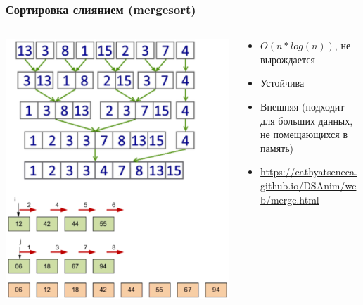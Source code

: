 \documentclass[xetex,mathserif,serif]{beamer}
\begin{document}
	\begin{frame}
		\frametitle{Сортировка слиянием (mergesort)}
		\begin{columns}
			\begin{column}{0.45\textwidth}
				\includegraphics[width=\textwidth]{mergesort.png}
			\end{column}
			\begin{column}{0.55\textwidth}
				\begin{itemize}
					\item $O(n * log(n))$, не вырождается
					\item Устойчива
					\item Внешняя (подходит для больших данных, не помещающихся в память)
					\item \url{https://cathyatseneca.github.io/DSAnim/web/merge.html}
				\end{itemize}
			\end{column}
		\end{columns}
	\end{frame}
\end{document}
